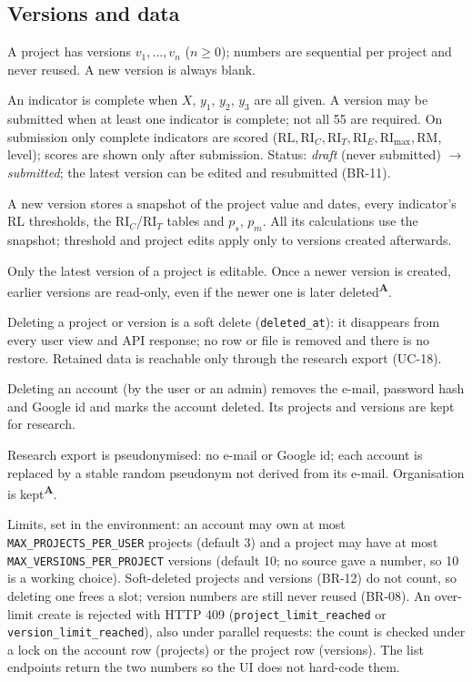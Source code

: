 \documentclass[11pt,a4paper]{article}
\newcommand{\RL}{\mathrm{RL}}
\newcommand{\RIC}{\mathrm{RI}_{C}}
\newcommand{\RIT}{\mathrm{RI}_{T}}
\newcommand{\RIE}{\mathrm{RI}_{E}}
\newcommand{\RImax}{\mathrm{RI}_{\max}}
\newcommand{\RM}{\mathrm{RM}}
\newcommand{\assume}{\textsuperscript{\textcolor{orange!80!black}{\textbf{A}}}}
\begin{document}
\subsection*{Versions and data}
\begin{description}[style=nextline,leftmargin=1.6cm,labelwidth=1.4cm,font=\bfseries\color{creBlue}]
\item[BR-08] A project has versions $v_1,\dots,v_n$ ($n\ge0$); numbers are sequential per project and never reused. A new version is always blank.
\item[BR-09] An indicator is complete when $X$, $y_1$, $y_2$, $y_3$ are all given. A version may be submitted when at least one indicator is complete; not all 55 are required. On submission only complete indicators are scored ($\RL,\RIC,\RIT,\RIE,\RImax,\RM$, level); scores are shown only after submission. Status: \emph{draft} (never submitted) $\to$ \emph{submitted}; the latest version can be edited and resubmitted (BR-11).
\item[BR-10] A new version stores a snapshot of the project value and dates, every indicator's RL thresholds, the $\RIC$/$\RIT$ tables and $p_s$, $p_m$. All its calculations use the snapshot; threshold and project edits apply only to versions created afterwards.
\item[BR-11] Only the latest version of a project is editable. Once a newer version is created, earlier versions are read-only, even if the newer one is later deleted\assume.
\item[BR-12] Deleting a project or version is a soft delete (\texttt{deleted\_at}): it disappears from every user view and API response; no row or file is removed and there is no restore. Retained data is reachable only through the research export (UC-18).
\item[BR-13] Deleting an account (by the user or an admin) removes the e-mail, password hash and Google id and marks the account deleted. Its projects and versions are kept for research.
\item[BR-14] Research export is pseudonymised: no e-mail or Google id; each account is replaced by a stable random pseudonym not derived from its e-mail. Organisation is kept\assume.
\item[BR-27] Limits, set in the environment: an account may own at most \texttt{MAX\_PROJECTS\_PER\_USER} projects (default 3) and a project may have at most \texttt{MAX\_VERSIONS\_PER\_PROJECT} versions (default 10; no source gave a number, so 10 is a working choice). Soft-deleted projects and versions (BR-12) do not count, so deleting one frees a slot; version numbers are still never reused (BR-08). An over-limit create is rejected with HTTP 409 (\texttt{project\_limit\_reached} or \texttt{version\_limit\_reached}), also under parallel requests: the count is checked under a lock on the account row (projects) or the project row (versions). The list endpoints return the two numbers so the UI does not hard-code them.
\end{description}
\end{document}
